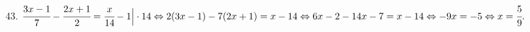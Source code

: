 43. $\cfrac{3x-1}{7}-\cfrac{2x+1}{2}=\cfrac{x}{14}-1\Big|\cdot14\Leftrightarrow
2(3x-1)-7(2x+1)=x-14\Leftrightarrow6x-2-14x-7=x-14\Leftrightarrow -9x=-5\Leftrightarrow x=\cfrac{5}{9}.$\\

